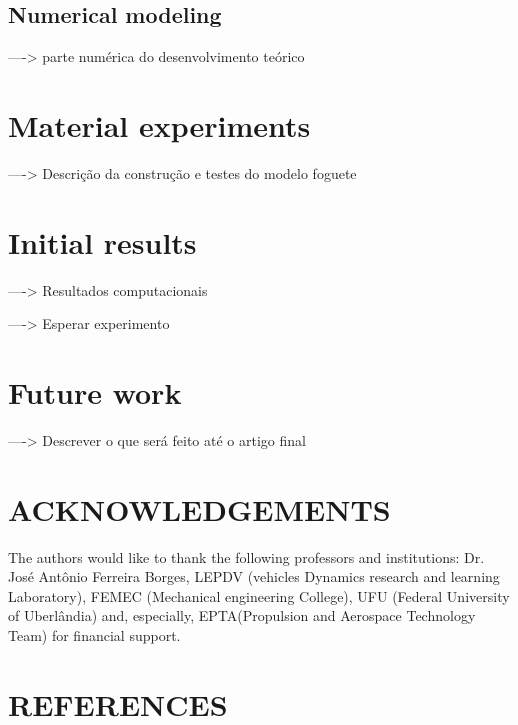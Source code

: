 \documentclass[10pt,fleqn,a4paper,twoside]{article}
\begin{document}
\subsection{Numerical modeling}

----> parte numérica do desenvolvimento teórico


\section{Material experiments}

----> Descrição da construção e testes do modelo foguete


\section{Initial results}


----> Resultados computacionais


----> Esperar experimento

\section{Future work}


----> Descrever o que será feito até o artigo final


\section{ACKNOWLEDGEMENTS}
The authors would like to thank the following professors and institutions: Dr. José Antônio Ferreira Borges, LEPDV (vehicles Dynamics research and learning Laboratory), FEMEC (Mechanical engineering College), UFU (Federal University of Uberl\^andia) and, especially, EPTA(Propulsion and Aerospace Technology Team) for financial support.




\section{REFERENCES} 


\renewcommand{\refname}{}

\end{document}
